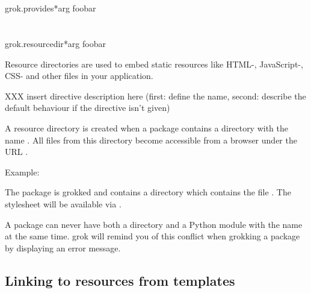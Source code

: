     \section{}

        \begin{funcdesc}{grok.provides}{*arg}
        foobar
        \end{funcdesc}

    \section{}

        \begin{funcdesc}{grok.resourcedir}{*arg}
        foobar
        \end{funcdesc}

        Resource directories are used to embed static resources like HTML-,
        JavaScript-, CSS- and other files in your application.

        XXX insert directive description here (first: define the name, second:
        describe the default behaviour if the directive isn't given)

        A resource directory is created when a package contains a directory
        with the name . All files from this directory become
        accessible from a browser under the URL
        .

        \begin{bf}Example:\end{bf} The package  is grokked and
        contains a directory  which contains the file
        . The stylesheet will be available via
        .

        \begin{notice}
        A package can never have both a  directory and a Python
        module with the name  at the same time. grok will
        remind you of this conflict when grokking a package by displaying an
        error message.
        \end{notice}

        \subsection{Linking to resources from templates}

